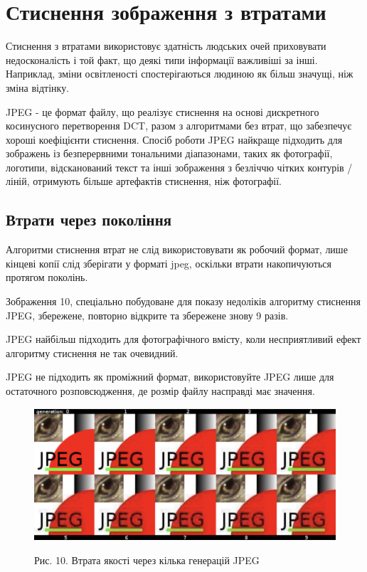 \documentclass[a4paper,12pt]{article}
\begin{document}
    \section{Стиснення зображення з втратами}\label{sec:lossy_image_compression}
    Стиснення з втратами використовує здатність людських очей приховувати недосконалість і той факт, що деякі типи інформації важливіші за інші.
    Наприклад, зміни освітленості спостерігаються людиною як більш значущі, ніж зміна відтінку.

    JPEG - це формат файлу, що реалізує стиснення на основі дискретного косинусного перетворення DCT, разом з алгоритмами без втрат, що забезпечує хороші коефіцієнти стиснення.
    Спосіб роботи JPEG найкраще підходить для зображень із безперервними тональними діапазонами, таких як фотографії, логотипи, відсканований текст та інші зображення з безліччю чітких контурів / ліній, отримують більше артефактів стиснення, ніж фотографії.

    \subsection{Втрати через покоління}\label{sec:loss_through_generations}
    Алгоритми стиснення втрат не слід використовувати як робочий формат, лише кінцеві копії слід зберігати у форматі jpeg, оскільки втрати накопичуються протягом поколінь.

    Зображення 10, спеціально побудоване для показу недоліків алгоритму стиснення JPEG, збережене, повторно відкрите та збережене знову 9 разів.

    JPEG найбільш підходить для фотографічного вмісту, коли несприятливий ефект алгоритму стиснення не так очевидний.

    JPEG не підходить як проміжний формат, використовуйте JPEG лише для остаточного розповсюдження, де розмір файлу насправді має значення.

    \begin{figure}
        \label{fig:image10}
        \centering
        \includegraphics[scale=0.5]{image10.png}

        Рис. 10. Втрата якості через кілька генерацій JPEG
    \end{figure}
\end{document}
